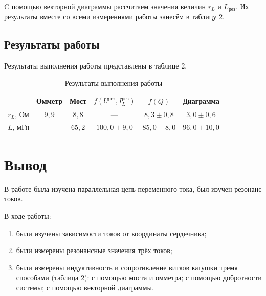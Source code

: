 \documentclass[a4paper]{article}
\theoremstyle{definition}
\theoremstyle{remark}
\begin{document}
C помощью векторной диаграммы рассчитаем значения величин $r_L$ и $L_{\text{рез}}$. Их результаты вместе со всеми измерениями работы занесём в таблицу 2.

\subsection{Результаты работы}

Результаты выполнения работы представлены в таблице 2.

\begin{table}[h!]
    \centering
    \caption{Результаты выполнения работы}
    \begin{tabular}{|c|c|c|c|c|c|}
    \hline
              & Омметр & Мост & $f(U^{\text{рез}}, I_L^{\text{рез}})$ & $f(Q)$ & Диаграмма \\ \hline
    $r_L$, Ом & $9,9$    & $8,8$  & ---       & $8,3 \pm 0,8$ & $3,0 \pm 0,6$       \\ \hline
    $L$, мГн  & ---    & $65,2$ & $100,0 \pm 9,0$     & $85,0 \pm 8,0$ & $96,0 \pm 10,0$      \\ \hline
    \end{tabular}
    \end{table}

\section{Вывод}

В работе была изучена параллельная цепь переменного тока, был изучен резонанс токов. \medskip

\noindent В ходе работы:
\begin{enumerate}
    \item были изучены зависимости токов от координаты сердечника;
    \item были измерены резонансные значения трёх токов;
    \item были измерены индуктивность и сопротивление витков катушки тремя способами (таблица 2): с помощью моста и омметра; с помощью добротности системы; с помощью векторной диаграммы.
\end{enumerate}
\end{document}
